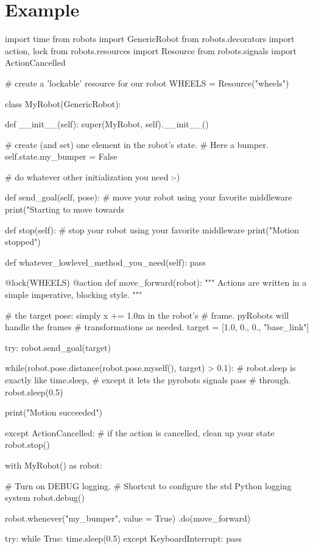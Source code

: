 \documentclass[a4paper, 10pt, conference]{ieeeconf}      %
\begin{document}
\section{Example}


\begin{pythoncode}
    import time
    from robots import GenericRobot
    from robots.decorators import action, lock
    from robots.resources import Resource
    from robots.signals import ActionCancelled

    # create a 'lockable' resource for our robot
    WHEELS = Resource("wheels")

    class MyRobot(GenericRobot):

      def __init__(self):
        super(MyRobot, self).__init__()

        # create (and set) one element in the robot's state.
        # Here a bumper.
        self.state.my_bumper = False

        # do whatever other initialization you need :-)

      def send_goal(self, pose):
        # move your robot using your favorite middleware
        print("Starting to move towards %

      def stop(self):
        # stop your robot using your favorite middleware
        print("Motion stopped")

      def whatever_lowlevel_method_you_need(self):
        pass

    @lock(WHEELS)
    @action
    def move_forward(robot):
      """ Actions are written in a simple imperative, 
          blocking style.
      """

      # the target pose: simply x += 1.0m in the robot's 
      # frame. pyRobots will handle the frames 
      # transformations as needed.
      target = [1.0, 0., 0., "base_link"]

      try:
        robot.send_goal(target)

        while(robot.pose.distance(robot.pose.myself(), 
                                  target) > 0.1):
            # robot.sleep is exactly like time.sleep, 
            # except it lets the pyrobots signals pass 
            # through.
            robot.sleep(0.5)

        print("Motion succeeded")

      except ActionCancelled:
        # if the action is cancelled, clean up your state
        robot.stop()


    with MyRobot() as robot:

      # Turn on DEBUG logging.
      # Shortcut to configure the std Python logging system
      robot.debug()

      robot.whenever("my_bumper", value = True)
                                    .do(move_forward)

      try:
        while True:
          time.sleep(0.5)
      except KeyboardInterrupt:
        pass
\end{pythoncode}
\end{document}
